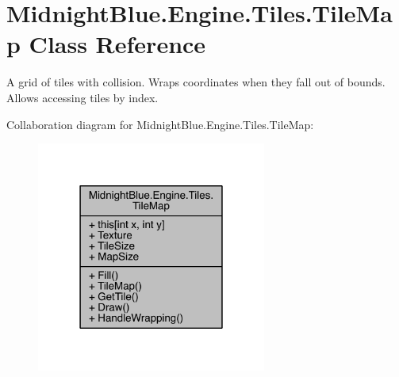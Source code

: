 \hypertarget{class_midnight_blue_1_1_engine_1_1_tiles_1_1_tile_map}{}\section{Midnight\+Blue.\+Engine.\+Tiles.\+Tile\+Map Class Reference}
\label{class_midnight_blue_1_1_engine_1_1_tiles_1_1_tile_map}


A grid of tiles with collision. Wraps coordinates when they fall out of bounds. Allows accessing tiles by index.  




Collaboration diagram for Midnight\+Blue.\+Engine.\+Tiles.\+Tile\+Map\+:
\nopagebreak
\begin{figure}[H]
\begin{center}
\leavevmode
\includegraphics[width=214pt]{class_midnight_blue_1_1_engine_1_1_tiles_1_1_tile_map__coll__graph}
\end{center}
\end{figure}
